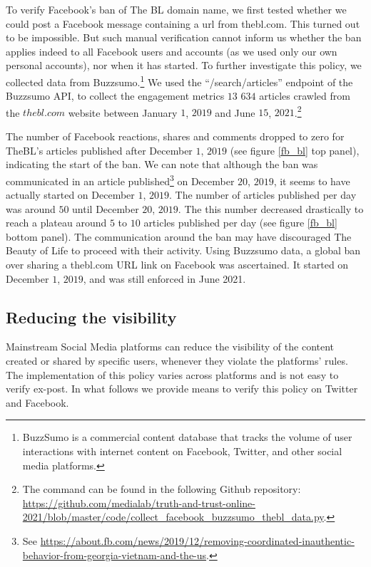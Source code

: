 \documentclass{article}
\begin{document}
To verify Facebook’s ban of The BL domain name, we first tested whether we could post a Facebook message containing a url from thebl.com. This turned out to be impossible. But such manual verification cannot inform us whether the ban applies indeed to all Facebook users and accounts (as we used only our own personal accounts), nor when it has started. To further investigate this policy, we collected data from Buzzsumo.\footnote{BuzzSumo is a commercial content database that tracks the volume of user interactions with internet content on Facebook, Twitter, and other social media platforms.} We used the ``/search/articles'' endpoint of the Buzzsumo API, to collect the engagement metrics $13$ $634$ articles crawled from the $thebl.com$ website between January $1$, $2019$ and June $15$, $2021$.\footnote{The command can be found in the following Github repository: \href{https://github.com/medialab/truth-and-trust-online-2021/blob/master/code/collect\_facebook\_buzzsumo\_thebl\_data.py}{https://github.com/medialab/truth-and-trust-online-2021/blob/master/code/collect\_facebook\_buzzsumo\_thebl\_data.py}.}

The number of Facebook reactions, shares and comments dropped to zero for TheBL’s articles published after December $1$, $2019$ (see figure \ref{fb_bl} top panel), indicating the start of the ban. We can note that although the ban was communicated in an article published\footnote{See \href{https://about.fb.com/news/2019/12/removing-coordinated-inauthentic-behavior-from-georgia-vietnam-and-the-us}{https://about.fb.com/news/2019/12/removing-coordinated-inauthentic-behavior-from-georgia-vietnam-and-the-us}.} on December $20$, $2019$, it seems to have actually started on December $1$, $2019$. The number of articles published per day was around $50$ until December $20$, $2019$. The this number decreased drastically to reach a {\color{pink} plateau} around $5$ to $10$ articles published per day (see figure \ref{fb_bl} bottom panel). The communication around the ban may have discouraged The Beauty of Life to proceed with their activity. Using Buzzsumo data, a global ban over sharing a thebl.com URL link on Facebook was ascertained. It started on December $1$, $2019$, and was still enforced in June 2021.




\subsection{Reducing the visibility}

Mainstream Social Media platforms can reduce the visibility of the content created or shared by specific users, whenever they violate the platforms' rules. The implementation of this policy varies across platforms and is not easy to verify ex-post. In what follows we provide means to verify this policy on Twitter and Facebook.  
\end{document}
